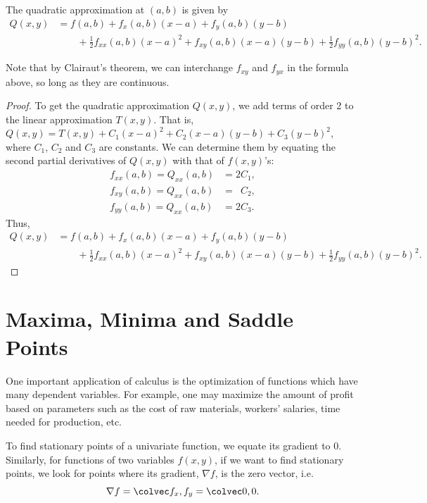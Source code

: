 \begin{proposition}
    The quadratic approximation at $(a, b)$ is given by
    \begin{align*}
        Q(x, y) &= f(a, b) + f_x(a, b) (x-a) + f_y(a, b) (y-b)\\
        &\hspace{2em} + \frac12 f_{xx}(a,b) (x-a)^2 + f_{xy}(a, b) (x-a)(y-b) + \frac12 f_{yy}(a, b) (y-b)^2.
    \end{align*}
\end{proposition}
Note that by Clairaut's theorem, we can interchange $f_{xy}$ and $f_{yx}$ in the formula above, so long as they are continuous.
\begin{proof}
    To get the quadratic approximation $Q(x, y)$, we add terms of order 2 to the linear approximation $T(x, y)$. That is, $Q(x, y) =  T(x,y) + C_1 (x-a)^2 + C_2 (x-a)(y-b) + C_3 (y-b)^2$, where $C_1$, $C_2$ and $C_3$ are constants. We can determine them by equating the second partial derivatives of $Q(x, y)$ with that of $f(x, y)$'s:
    \begin{align*}
        f_{xx}(a, b) = Q_{xx}(a, b) &= 2C_1,\\
        f_{xy}(a, b) = Q_{xx}(a, b) &= \phantom{2}C_2,\\
        f_{yy}(a, b) = Q_{xx}(a, b) &= 2C_3.
    \end{align*}
    Thus,
    \begin{align*}
        Q(x, y) &= f(a, b) + f_x(a, b) (x-a) + f_y(a, b) (y-b)\\
        &\hspace{2em} + \frac12 f_{xx}(a,b) (x-a)^2 + f_{xy}(a, b) (x-a)(y-b) + \frac12 f_{yy}(a, b) (y-b)^2.
    \end{align*}
\end{proof}

\section{Maxima, Minima and Saddle Points}

One important application of calculus is the optimization of functions which have many dependent variables. For example, one may maximize the amount of profit based on parameters such as the cost of raw materials, workers' salaries, time needed for production, etc.

To find stationary points of a univariate function, we equate its gradient to 0. Similarly, for functions of two variables $f(x, y)$, if we want to find stationary points, we look for points where its gradient, $\nabla f$, is the zero vector, i.e. \[\nabla f = \cvecii{f_x}{f_y} = \cvecii00.\]

